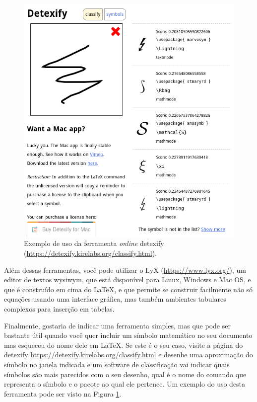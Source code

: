 \begin{figure}[ht]
	\begin{center}
		\includegraphics[scale=0.5]{./imagens/capitulo4/detexify.png}
		
	\end{center}
	\caption{Exemplo de uso da ferramenta \textit{online} detexify (\url{https://detexify.kirelabs.org/classify.html}).}
	\label{fig:detexify}
\end{figure}

Além dessas ferramentas, você pode utilizar o LyX (\url{https://www.lyx.org/}), um editor de textos \gls{wysiwym}, que está disponível para Linux, Windows e Mac OS, e que é construído em cima do \LaTeX{}, e que permite se construir facilmente não só equações usando uma interface gráfica, mas também ambientes tabulares complexos para inserção em tabelas.

Finalmente, gostaria de indicar uma ferramenta simples, mas que pode ser bastante útil quando você quer incluir um símbolo matemático no seu documento mas esqueceu do nome dele em \LaTeX{}. Se este é o seu caso, visite a página do detexify
\url{https://detexify.kirelabs.org/classify.html} e desenhe uma aproximação do símbolo no janela indicada e um software de classificação vai indicar quais símbolos são mais parecidos com o seu desenho, qual é o nome do comando que representa o símbolo e o pacote ao qual ele pertence. Um exemplo do uso desta ferramenta pode ser visto na Figura \ref{fig:detexify}.

